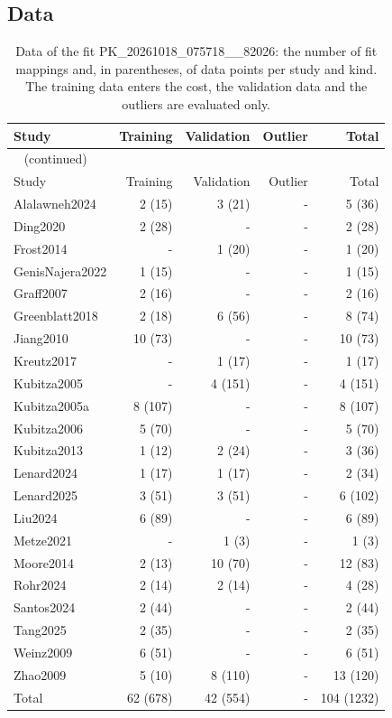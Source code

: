 \documentclass{article}
\begin{document}
\subsection{Data}

\begin{longtable}{lrrrr}
\caption{Data of the fit PK\_20261018\_075718\_\_82026: the number of fit mappings and, in parentheses, of data points per study and kind. The training data enters the cost, the validation data and the outliers are evaluated only.}\label{tab:data:PK_20261018_075718__82026} \\
\toprule
Study & Training & Validation & Outlier & Total \\
\midrule
\endfirsthead
\multicolumn{5}{l}{\small\tablename~\thetable{} (continued)} \\
\toprule
Study & Training & Validation & Outlier & Total \\
\midrule
\endhead
\bottomrule
\endlastfoot
Alalawneh2024 & 2 (15) & 3 (21) & - & 5 (36) \\
Ding2020 & 2 (28) & - & - & 2 (28) \\
Frost2014 & - & 1 (20) & - & 1 (20) \\
GenisNajera2022 & 1 (15) & - & - & 1 (15) \\
Graff2007 & 2 (16) & - & - & 2 (16) \\
Greenblatt2018 & 2 (18) & 6 (56) & - & 8 (74) \\
Jiang2010 & 10 (73) & - & - & 10 (73) \\
Kreutz2017 & - & 1 (17) & - & 1 (17) \\
Kubitza2005 & - & 4 (151) & - & 4 (151) \\
Kubitza2005a & 8 (107) & - & - & 8 (107) \\
Kubitza2006 & 5 (70) & - & - & 5 (70) \\
Kubitza2013 & 1 (12) & 2 (24) & - & 3 (36) \\
Lenard2024 & 1 (17) & 1 (17) & - & 2 (34) \\
Lenard2025 & 3 (51) & 3 (51) & - & 6 (102) \\
Liu2024 & 6 (89) & - & - & 6 (89) \\
Metze2021 & - & 1 (3) & - & 1 (3) \\
Moore2014 & 2 (13) & 10 (70) & - & 12 (83) \\
Rohr2024 & 2 (14) & 2 (14) & - & 4 (28) \\
Santos2024 & 2 (44) & - & - & 2 (44) \\
Tang2025 & 2 (35) & - & - & 2 (35) \\
Weinz2009 & 6 (51) & - & - & 6 (51) \\
Zhao2009 & 5 (10) & 8 (110) & - & 13 (120) \\
Total & 62 (678) & 42 (554) & - & 104 (1232) \\
\end{longtable}
\end{document}
